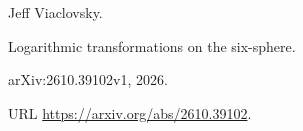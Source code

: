 Jeff Viaclovsky.

\newblock Logarithmic transformations on the six-sphere.

\newblock arXiv:2610.39102v1, 2026{}.

\newblock URL \url{https://arxiv.org/abs/2610.39102}.
